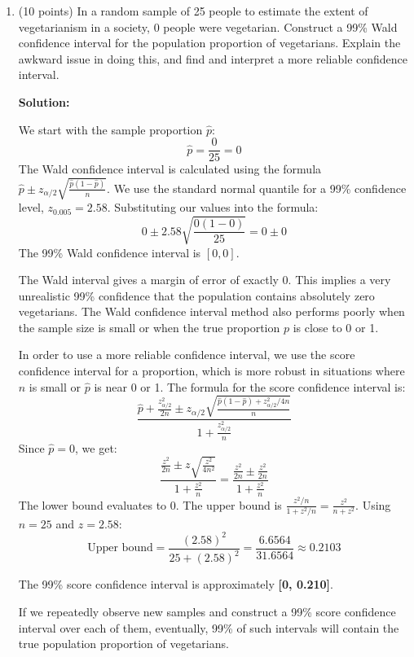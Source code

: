 \documentclass[12pt,letterpaper]{article}
\begin{document}
\begin{enumerate}[leftmargin=*]

\item (10 points) In a random sample of 25 people to estimate the extent of vegetarianism in a society, 0 people were vegetarian. Construct a 99\% Wald confidence interval for the population proportion of vegetarians. Explain the awkward issue in doing this, and find and interpret a more reliable confidence interval.

\textbf{Solution:}

We start with the sample proportion $\hat{p}$:
\[ \hat{p} = \frac{0}{25} = 0 \]
The Wald confidence interval is calculated using the formula $\hat{p} \pm z_{\alpha/2}\sqrt{\frac{\hat{p}(1-\hat{p})}{n}}$.
We use the standard normal quantile for a 99\% confidence level, $z_{0.005} = 2.58$.
Substituting our values into the formula:
\[ 0 \pm 2.58 \sqrt{\frac{0(1-0)}{25}} = 0 \pm 0 \]
The 99\% Wald confidence interval is $[0, 0]$.

The Wald interval gives a margin of error of exactly 0. This implies a very unrealistic 99\% confidence that the population contains absolutely zero vegetarians. The Wald confidence interval method also performs poorly when the sample size is small or when the true proportion $p$ is close to 0 or 1.

In order to use a more reliable confidence interval, we use the score confidence interval for a proportion, which is more robust in situations where $n$ is small or $\hat{p}$ is near 0 or 1. The formula for the score confidence interval is:
\[ \frac{\hat{p} + \frac{z_{\alpha/2}^2}{2n} \pm z_{\alpha/2}\sqrt{\frac{\hat{p}(1-\hat{p}) + z_{\alpha/2}^2/4n}{n}}}{1 + \frac{z_{\alpha/2}^2}{n}} \]
Since $\hat{p} = 0$, we get:
\[ \frac{\frac{z^2}{2n} \pm z\sqrt{\frac{z^2}{4n^2}}}{1 + \frac{z^2}{n}} = \frac{\frac{z^2}{2n} \pm \frac{z^2}{2n}}{1 + \frac{z^2}{n}} \]
The lower bound evaluates to $0$. 
The upper bound is $\frac{z^2/n}{1 + z^2/n} = \frac{z^2}{n + z^2}$.
Using $n = 25$ and $z = 2.58$:
\[ \text{Upper bound} = \frac{(2.58)^2}{25 + (2.58)^2} = \frac{6.6564}{31.6564} \approx 0.2103 \]

The 99\% score confidence interval is approximately \textbf{[0, 0.210]}.

If we repeatedly observe new samples and construct a 99\% score confidence interval over each of them, eventually, 99\% of such intervals will contain the true population proportion of vegetarians.


\end{enumerate}
\end{document}
